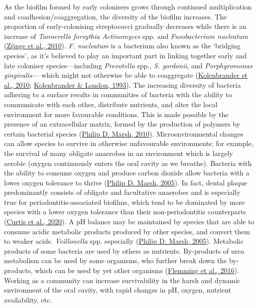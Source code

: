 \documentclass[
  letterpaper,
]{book}
\begin{document}
As the biofilm formed by early colonisers grows through continued
multiplication and coadhesion/coaggregation, the diversity of the
biofilm increases. The proportion of early-colonising streptococci
gradually decreases while there is an increase of \emph{Tannerella
forsythia} \emph{Actinomyces} spp. and \emph{Fusobacterium nucleatum}
(\protect\hyperlink{ref-zijngeBiofilmArchitecture2010}{Zijnge et al.,
2010}). \emph{F. nucleatum} is a bacterium also known as the `bridging
species', as it's believed to play an important part in linking together
early and late coloniser species---including \emph{Prevotella} spp.,
\emph{S. gordonii}, and \emph{Porphyromonas gingivalis}--- which might
not otherwise be able to coaggregate
(\protect\hyperlink{ref-kolenbranderOralMultispecies2010}{Kolenbrander
et al., 2010};
\protect\hyperlink{ref-kolenbranderAdhereToday1993}{Kolenbrander \&
London, 1993}). The increasing diversity of bacteria adhering to a
surface results in communities of bacteria with the ability to
communicate with each other, distribute nutrients, and alter the local
environment for more favourable conditions. This is made possible by the
presence of an extracellular matrix, formed by the production of
polymers by certain bacterial species
(\protect\hyperlink{ref-marshMicrobiologyDental2010}{Philip D. Marsh,
2010}). Microenvironmental changes can allow species to survive in
otherwise unfavourable environments; for example, the survival of many
obligate anaerobes in an environment which is largely aerobic (oxygen
continuously enters the oral cavity as we breathe). Bacteria with the
ability to consume oxygen and produce carbon dioxide allow bacteria with
a lower oxygen tolerance to thrive
(\protect\hyperlink{ref-marshDentalPlaque2005}{Philip D. Marsh, 2005}).
In fact, dental plaque predominantly consists of obligate and
facultative anaerobes and is especially true for
periodontitis-associated biofilms, which tend to be dominated by more
species with a lower oxygen tolerance than their non-periodontitis
counterparts (\protect\hyperlink{ref-curtisRoleMicrobiota2020}{Curtis et
al., 2020}). A pH balance may be maintained by species that are able to
consume acidic metabolic products produced by other species, and convert
them to weaker acids. \emph{Veillonella} spp. especially
(\protect\hyperlink{ref-marshDentalPlaque2005}{Philip D. Marsh, 2005}).
Metabolic products of some bacteria are used by others as nutrients.
By-products of urea metabolism can be used by some organisms, who
further break down the by-products, which can be used by yet other
organisms (\protect\hyperlink{ref-flemmingBiofilmsEmergent2016}{Flemming
et al., 2016}). Working as a community can increase survivability in the
harsh and dynamic environment of the oral cavity, with rapid changes in
pH, oxygen, nutrient availability, etc.
\end{document}
